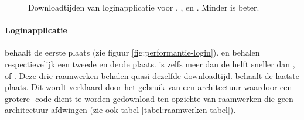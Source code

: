 \begin{figure}
  \centering
  \quad
  \caption{Downloadtijden van loginapplicatie voor \st{}, \kendo{},  \jqm{} en \lungo{}. Minder is beter.}
  \label{fig:performantie-login-boxplot}
\end{figure}

\paragraph{Loginapplicatie}
\lungo{} behaalt de eerste plaats (zie figuur \ref{fig:performantie-login}).
\jqm{} en \kendo{} behalen respectievelijk een tweede en derde plaats.
\lungo{} is zelfs meer dan de helft sneller dan \jqm{}, \kendo{} of \st{}.
Deze drie raamwerken behalen quasi dezelfde downloadtijd.
\st{} behaalt de laatste plaats.
Dit wordt verklaard door het gebruik van een architectuur waardoor een grotere \js{}-code dient te worden gedownload ten opzichte van raamwerken die geen architectuur afdwingen (zie ook tabel \ref{tabel:raamwerken-tabel}).

